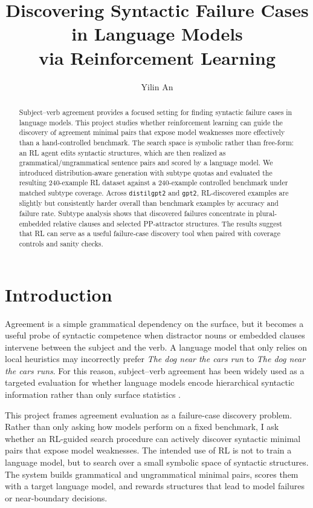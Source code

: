 \documentclass[11pt]{article}
\title{Discovering Syntactic Failure Cases in Language Models\\
via Reinforcement Learning}
\author{Yilin An}
\begin{document}
\maketitle
\begin{abstract}
Subject--verb agreement provides a focused setting for finding syntactic
failure cases in language models. This project studies whether reinforcement
learning can guide the discovery of agreement minimal pairs that expose
model weaknesses more effectively than a hand-controlled benchmark. The search
space is symbolic rather than free-form: an RL agent edits syntactic structures,
which are then realized as grammatical/ungrammatical sentence pairs and scored
by a language model. We introduced distribution-aware
generation with subtype quotas and evaluated the resulting 240-example RL
dataset against a 240-example controlled benchmark under matched subtype
coverage. Across \texttt{distilgpt2} and \texttt{gpt2}, RL-discovered examples
are slightly but consistently harder overall than benchmark examples by
accuracy and failure rate. Subtype analysis shows that discovered failures concentrate in
plural-embedded relative clauses and selected PP-attractor structures. The
results suggest that RL can serve as a useful failure-case discovery tool when
paired with coverage controls and sanity checks.
\end{abstract}

\section{Introduction}

Agreement is a simple grammatical dependency on the surface, but it becomes a
useful probe of syntactic competence when distractor nouns or embedded clauses
intervene between the subject and the verb. A language model that only relies
on local heuristics may incorrectly prefer \emph{The dog near the cars run} to
\emph{The dog near the cars runs}. For this reason, subject--verb agreement
has been widely used as a targeted evaluation for whether language models
encode hierarchical syntactic information rather than only surface statistics
\citep{linzen2016assessing,gulordava2018colorless,warstadt2020blimp}.

This project frames agreement evaluation as a failure-case discovery problem.
Rather than only asking how models perform on a fixed benchmark, I ask whether
an RL-guided search procedure can actively discover syntactic minimal pairs
that expose model weaknesses. The intended use of RL is not to train a language
model, but to search over a small symbolic space of syntactic structures. The
system builds grammatical and ungrammatical minimal pairs, scores them with a
target language model, and rewards structures that lead to model failures or
near-boundary decisions.
\end{document}
